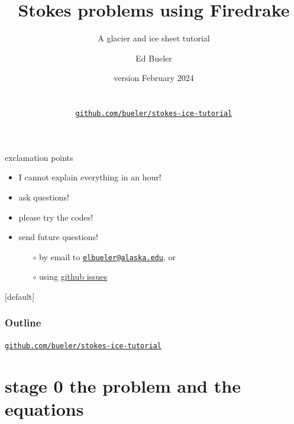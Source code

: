 \documentclass[10pt,
               hyperref={colorlinks,citecolor=DeepPink4,linkcolor=black,urlcolor=blue},
               svgnames]{beamer}
\title{Stokes problems using Firedrake}
\subtitle{A glacier and ice sheet tutorial}
\author{Ed Bueler}
\institute[UAF]{University of Alaska Fairbanks}
\date[Feb 2024]{version February 2024  \\ \phantom{foo} \\ \phantom{foo} \\
\large \href{https://github.com/bueler/stokes-ice-tutorial}{\texttt{github.com/bueler/stokes-ice-tutorial}} }
\begin{document}
\beamertemplatenavigationsymbolsempty

\begin{frame}
  \maketitle
\end{frame}


\begin{frame}{exclamation points}

\begin{itemize}
\item \alert{I cannot explain everything in an hour!}

\item \alert{ask questions!}

\item \alert{please try the codes!}

\item \alert{send future questions!}
  \begin{itemize}
  \item[$\circ$] by email to \href{mailto:elbueler@alaska.edu}{\texttt{elbueler@alaska.edu}}, or
  \item[$\circ$] using \href{https://github.com/bueler/stokes-ice-tutorial/issues}{github issues}
  \end{itemize}
\end{itemize}
\end{frame}


[default] 

\begin{frame}
  \frametitle{Outline}

\centerline{\large \href{https://github.com/bueler/stokes-ice-tutorial}{\texttt{github.com/bueler/stokes-ice-tutorial}}}

\bigskip
  \tableofcontents[hideallsubsections]
\end{frame}


\section{stage 0 \hspace{9.3mm} the problem and the equations}
\end{document}
